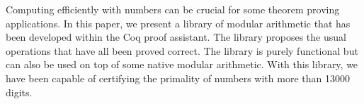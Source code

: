 Computing efficiently with numbers can be crucial for some theorem proving applications.
In this paper, we present a library of modular arithmetic that has been developed within
the {\sc Coq} proof assistant. The library proposes the usual operations that have all been
proved correct. The library is purely functional but can also be used on top of some native
modular arithmetic. 
With this library, we have been capable of certifying the primality of numbers with
more than 13000 digits.
